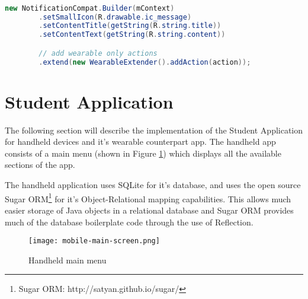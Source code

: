 \begin{lstlisting}[language=Java]

new NotificationCompat.Builder(mContext)
        .setSmallIcon(R.drawable.ic_message)
        .setContentTitle(getString(R.string.title))
        .setContentText(getString(R.string.content))

        // add wearable only actions
        .extend(new WearableExtender().addAction(action));

\end{lstlisting}


\section{Student Application}

The following section will describe the implementation of the Student
Application for handheld devices and it's wearable counterpart app. The handheld
app consists of a main menu (shown in Figure \ref{fig:handheld_main_menu}) which displays all the
available sections of the app.

The handheld application uses SQLite for it's database, and uses the open source
Sugar ORM\footnote{Sugar ORM: http://satyan.github.io/sugar/} for it's
Object-Relational mapping capabilities. This allows much easier storage of Java
objects in a relational database and Sugar ORM provides much of the database
boilerplate code through the use of Reflection.

\begin{figure}
    \centering
    \texttt{[image: mobile-main-screen.png]}
    \caption{Handheld main menu}
    \label{fig:handheld_main_menu}
\end{figure}

